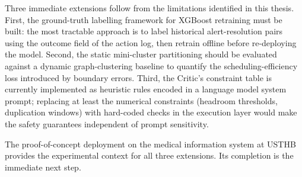 \documentclass[12pt,a4paper]{report}
\begin{document}
Three immediate extensions follow from the limitations identified in this thesis.
First, the ground-truth labelling framework for XGBoost retraining must be built: the
most tractable approach is to label historical alert-resolution pairs using the
outcome field of the action log, then retrain offline before re-deploying the model.
Second, the static mini-cluster partitioning should be evaluated against a dynamic
graph-clustering baseline to quantify the scheduling-efficiency loss introduced by
boundary errors. Third, the Critic's constraint table is currently implemented as
heuristic rules encoded in a language model system prompt; replacing at least the
numerical constraints (headroom thresholds, duplication windows) with hard-coded
checks in the execution layer would make the safety guarantees independent of prompt
sensitivity.

The proof-of-concept deployment on the medical information system at USTHB provides
the experimental context for all three extensions. Its completion is the immediate
next step.
\end{document}
